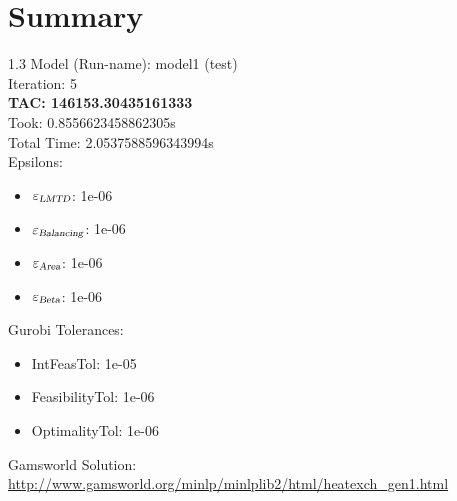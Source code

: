 \documentclass{article}%
\begin{document}
%
\normalsize%
\section{Summary}%
\thispagestyle{plain}%
\begin{spacing}{1.3}%
\Large%
Model (Run-name): model1 (test)\\%
Iteration: 5\\%
\textbf{TAC: 146153.30435161333}\\%
Took: 0.8556623458862305s\\%
Total Time: 2.0537588596343994s\\%
Epsilons:%
\begin{itemize}%
	\item $\varepsilon_{\textsl{LMTD}}$: 1e-06%
	\item $\varepsilon_{\textsl{Balancing}}$: 1e-06%
	\item $\varepsilon_{\textsl{Area}}$: 1e-06%
	\item $\varepsilon_{\textsl{Beta}}$: 1e-06%
\end{itemize}%
Gurobi Tolerances:%
\begin{itemize}%
	\item IntFeasTol: 1e-05%
	\item FeasibilityTol: 1e-06%
	\item OptimalityTol: 1e-06%
\end{itemize}%
\end{spacing}%
\normalsize%
Gamsworld Solution: \url{http://www.gamsworld.org/minlp/minlplib2/html/heatexch_gen1.html}%
%
\clearpage%
\end{document}
